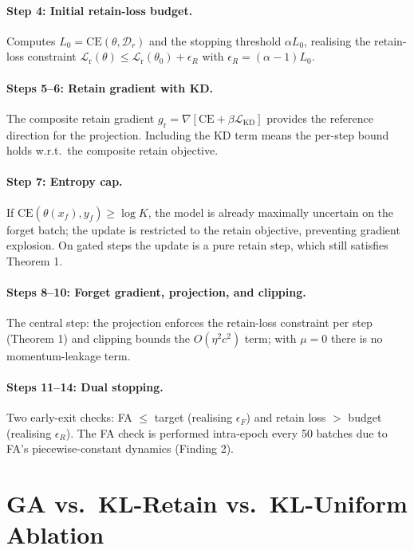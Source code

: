 \documentclass[letterpaper]{article}
\newcommand{\CE}{\mathrm{CE}}
\newcommand{\Dr}{\mathcal{D}_r}
\newcommand{\gr}{g_{\mathrm{r}}}
\newcommand{\lossr}{\mathcal{L}_{\mathrm{r}}}
\newcommand{\losskd}{\mathcal{L}_{\mathrm{KD}}}
\begin{document}
\paragraph{Step 4: Initial retain-loss budget.}
Computes $L_0 = \CE(\theta, \Dr)$ and the stopping threshold $\alpha L_0$, realising the retain-loss constraint $\lossr(\theta) \le \lossr(\theta_0) + \epsilon_R$ with $\epsilon_R = (\alpha - 1)L_0$.

\paragraph{Steps 5--6: Retain gradient with KD.}
The composite retain gradient $\gr = \nabla[\CE + \beta\losskd]$ provides the reference direction for the projection. Including the KD term means the per-step bound holds w.r.t.\ the composite retain objective.

\paragraph{Step 7: Entropy cap.}
If $\CE(\theta(x_f), y_f) \ge \log K$, the model is already maximally uncertain on the forget batch; the update is restricted to the retain objective, preventing gradient explosion. On gated steps the update is a pure retain step, which still satisfies Theorem 1.

\paragraph{Steps 8--10: Forget gradient, projection, and clipping.}
The central step: the projection enforces the retain-loss constraint per step (Theorem 1) and clipping bounds the $O(\eta^2 c^2)$ term; with $\mu{=}0$ there is no momentum-leakage term.

\paragraph{Steps 11--14: Dual stopping.}
Two early-exit checks: FA $\le$ target (realising $\epsilon_F$) and retain loss $> $ budget (realising $\epsilon_R$). The FA check is performed intra-epoch every 50 batches due to FA's piecewise-constant dynamics (Finding 2).

\section{GA vs.\ KL-Retain vs.\ KL-Uniform Ablation}
\end{document}
